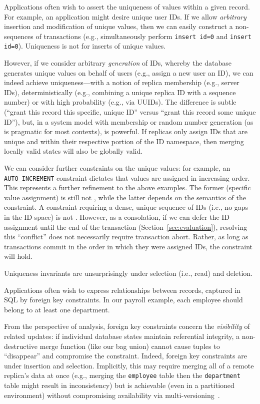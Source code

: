  Applications often wish to assert the uniqueness
of values within a given record. For example, an application might
desire unique user IDs. If we allow \textit{arbitrary} insertion and
modification of unique values, then we can easily construct a
non-\iconfluent sequences of transactions (e.g., simultaneously
perform \texttt{insert id=0} and \texttt{insert id=0}). Uniqueness is
not \iconfluent for inserts of unique values. 

However, if we consider arbitrary \textit{generation} of IDs, whereby
the database generates unique values on behalf of users (e.g., assign
a new user an ID), we can indeed achieve uniqueness---with a notion of
replica membership (e.g., server IDs), deterministically (e.g.,
combining a unique replica ID with a sequence number) or with high
probability (e.g., via UUIDs). The difference is subtle (``grant this
record this specific, unique ID'' versus ``grant this record some
unique ID''), but, in a system model with membership or random number
generation (as is pragmatic for most contexts), is powerful. If
replicas only assign IDs that are unique and within their respective
portion of the ID namespace, then merging locally valid states will
also be globally valid.

We can consider further constraints on the unique values: for example,
an \texttt{AUTO\_INCREMENT} constraint dictates that values are
assigned in increasing order. This represents a further refinement to
the above examples. The former (specific value assignment) is still
not \iconfluent, while the latter depends on the semantics of the
constraint. A constraint requiring a dense, unique sequence of IDs
(i.e., no gaps in the ID space) is not \iconfluent. However, as a
consolation, if we can defer the ID assignment until the end of the
transaction (Section~\ref{sec:evaluation}), resolving this
``conflict'' does not necessarily require transaction abort. Rather,
as long as transactions commit in the order in which they were
assigned IDs, the constraint will hold.

Uniqueness invariants are unsurprisingly \iconfluent under selection
(i.e., read) and deletion.

 Applications often wish to express
relationships between records, captured in SQL by foreign key
constraints. In our payroll example, each employee should belong to at
least one department.

From the perspective of \iconfluence analysis, foreign key constraints
concern the \textit{visibility} of related updates: if individual
database states maintain referential integrity, a non-destructive
merge function (like our bag union) cannot cause tuples to
``disappear'' and compromise the constraint. Indeed, foreign key
constraints are \iconfluent under insertion and selection. Implicitly,
this may require merging all of a remote replica's data at once (e.g.,
merging the \texttt{employee} table then the \texttt{department} table
might result in inconsistency) but is achievable (even in a
partitioned environment) without compromising availability via
multi-versioning~\cite{ramp-txns,hat-vldb}.

